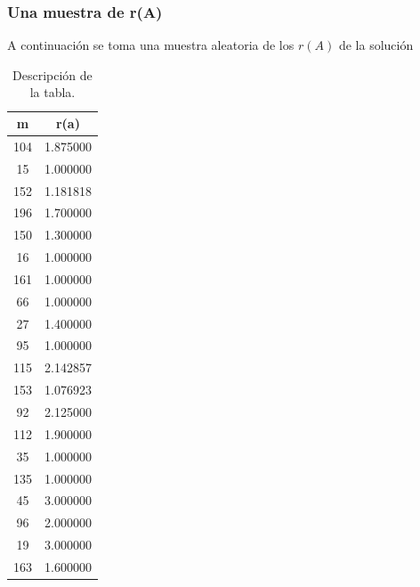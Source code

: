 \subsubsection{Una muestra de r(A)}

A continuación se toma una muestra aleatoria de los $r(A)$ de la solución
\begin{table}[H]
    \centering
    \begin{tabular}{cc}
    \hline
    \textbf{m} & \textbf{r(a)} \\
    \hline
    104 & 1.875000 \\
    15 & 1.000000 \\
    152 & 1.181818 \\
    196 & 1.700000 \\
    150 & 1.300000 \\
    16 & 1.000000 \\
    161 & 1.000000 \\
    66 & 1.000000 \\
    27 & 1.400000 \\
    95 & 1.000000 \\
    115 & 2.142857 \\
    153 & 1.076923 \\
    92 & 2.125000 \\
    112 & 1.900000 \\
    35 & 1.000000 \\
    135 & 1.000000 \\
    45 & 3.000000 \\
    96 & 2.000000 \\
    19 & 3.000000 \\
    163 & 1.600000 \\
    \hline
    \end{tabular}
    \caption{Descripción de la tabla.}
    \label{tabla:resultados}
\end{table}

